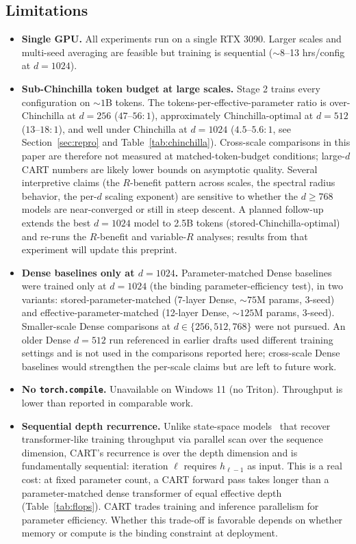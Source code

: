 \documentclass{article}
\newcommand{\cart}{\textsc{CART}}
\begin{document}
\subsection{Limitations}

\begin{itemize}[leftmargin=*, topsep=2pt, itemsep=1pt]
  \item \textbf{Single GPU.} All experiments run on a single RTX 3090. Larger scales and multi-seed averaging are feasible but training is sequential ($\sim$8--13 hrs/config at $d=1024$).
  \item \textbf{Sub-Chinchilla token budget at large scales.} Stage 2 trains every configuration on $\sim 1$B tokens. The tokens-per-effective-parameter ratio is over-Chinchilla at $d{=}256$ ($47$--$56:1$), approximately Chinchilla-optimal at $d{=}512$ ($13$--$18:1$), and well under Chinchilla at $d{=}1024$ ($4.5$--$5.6:1$, see Section~\ref{sec:repro} and Table~\ref{tab:chinchilla}). Cross-scale comparisons in this paper are therefore not measured at matched-token-budget conditions; large-$d$ \cart{} numbers are likely lower bounds on asymptotic quality. Several interpretive claims (the $R$-benefit pattern across scales, the spectral radius behavior, the per-$d$ scaling exponent) are sensitive to whether the $d \geq 768$ models are near-converged or still in steep descent. A planned follow-up extends the best $d{=}1024$ model to 2.5B tokens (stored-Chinchilla-optimal) and re-runs the $R$-benefit and variable-$R$ analyses; results from that experiment will update this preprint.
  \item \textbf{Dense baselines only at $d{=}1024$.} Parameter-matched Dense baselines were trained only at $d{=}1024$ (the binding parameter-efficiency test), in two variants: stored-parameter-matched (7-layer Dense, $\sim 75$M params, 3-seed) and effective-parameter-matched (12-layer Dense, $\sim 125$M params, 3-seed). Smaller-scale Dense comparisons at $d \in \{256, 512, 768\}$ were not pursued. An older Dense $d{=}512$ run referenced in earlier drafts used different training settings and is not used in the comparisons reported here; cross-scale Dense baselines would strengthen the per-scale claims but are left to future work.
  \item \textbf{No \texttt{torch.compile}.} Unavailable on Windows 11 (no Triton). Throughput is lower than reported in comparable work.
  \item \textbf{Sequential depth recurrence.} Unlike state-space models~\citep{gu2023mamba,dao2024mamba2,peng2023rwkv} that recover transformer-like training throughput via parallel scan over the sequence dimension, \cart{}'s recurrence is over the depth dimension and is fundamentally sequential: iteration $\ell$ requires $h_{\ell-1}$ as input. This is a real cost: at fixed parameter count, a \cart{} forward pass takes longer than a parameter-matched dense transformer of equal effective depth (Table~\ref{tab:flops}). \cart{} trades training and inference parallelism for parameter efficiency. Whether this trade-off is favorable depends on whether memory or compute is the binding constraint at deployment.
\end{itemize}
\end{document}
